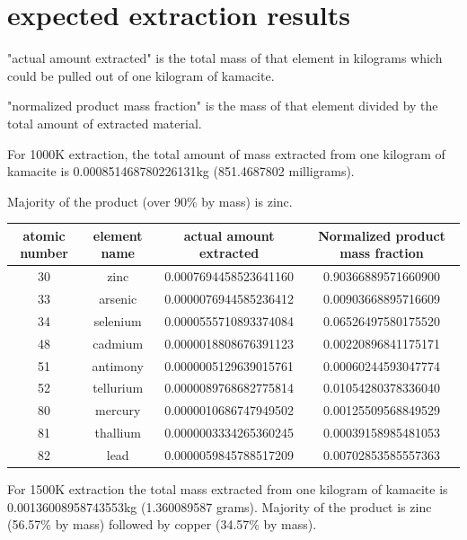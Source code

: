 \documentclass[a4paper]{article}
\begin{document}
	\pagebreak
	
	\section{expected extraction results}
	
	"actual amount extracted" is the total mass of that element in kilograms which could be pulled out of one kilogram of kamacite.
	
	\medskip
	
	"normalized product mass fraction" is the mass of that element divided by the total amount of extracted material.
	
	\bigskip
	
	For 1000K extraction, the total amount of mass extracted from one kilogram of kamacite is 0.000851468780226131kg (851.4687802 milligrams).
	
	Majority of the product (over 90\% by mass) is zinc.
	
    \begin{center}
	    \begin{tabular}{|c|c|c|c|}
	    	\hline
	    	atomic number & element name & actual amount extracted & Normalized product mass fraction \\
	    	\hline
	    	30 & zinc & 0.0007694458523641160 & 0.90366889571660900 \\
	    	\hline
	    	33 & arsenic & 0.0000076944585236412 & 0.00903668895716609 \\
	    	\hline
	    	34 & selenium & 0.0000555710893374084 & 0.06526497580175520 \\
	    	\hline
	    	48 & cadmium & 0.0000018808676391123 & 0.00220896841175171 \\
	    	\hline
	    	51 & antimony & 0.0000005129639015761 & 0.00060244593047774 \\
	    	\hline
	    	52 & tellurium & 0.0000089768682775814 & 0.01054280378336040 \\
	    	\hline
	    	80 & mercury & 0.0000010686747949502 & 0.00125509568849529 \\
	    	\hline
	    	81 & thallium & 0.0000003334265360245 & 0.00039158985481053 \\
	    	\hline
	    	82 & lead & 0.0000059845788517209 & 0.00702853585557363 \\
	    	\hline
	    \end{tabular}
    \end{center}
    
    For 1500K extraction the total mass extracted from one kilogram of kamacite is 0.00136008958743553kg (1.360089587 grams).
    Majority of the product is zinc (56.57\% by mass) followed by copper (34.57\% by mass).
    
\end{document}
